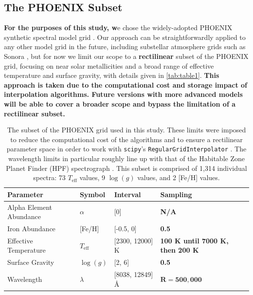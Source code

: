 \documentclass[twocolumn, linenumbers]{aastex631}
\begin{document}
\subsection{The PHOENIX Subset}
\textbf{For the purposes of this study, w}e chose the widely-adopted PHOENIX synthetic spectral model grid \citep{PHOENIX}.
Our approach can be straightforwardly applied to any other model grid in the future, including substellar atmosphere grids such as Sonora \citep{bobcat, cholla, diamondback, elfowl}, but for now we limit our scope to a \textbf{rectilinear} subset of the PHOENIX grid, focusing on near solar metallicities and a broad range of effective temperature and surface gravity, with details given in \autoref{tab:table1}.
\textbf{This approach is taken due to the computational cost and storage impact of interpolation algorithms.
Future versions with more advanced models will be able to cover a broader scope and bypass the limitation of a rectilinear subset.}

\begin{table}
    \hspace*{0.6cm}\begin{tabular}{llll}
        \hline
        \bf{Parameter} & \bf{Symbol} & \bf{Interval} & \bf{Sampling}\\
        \hline
        Alpha Element Abundance & $\alpha$ & [0]& \bf{N/A}\\
        Iron Abundance & [Fe/H] & [-0.5, 0] & \bf{0.5}\\
        Effective Temperature & $T_{\mathrm{eff}}$ & [2300, 12000] K & \bf{100 K until 7000 K, then 200 K}\\
        Surface Gravity & $\log(g)$ & [2, 6] & \bf{0.5} \\
        Wavelength & $\lambda$ & [8038, 12849] \AA & $\mathbf{R = 500,000}$\\
        \hline
    \end{tabular}
    \caption{The subset of the PHOENIX grid used in this study.
    These limits were imposed to reduce the computational cost of the algorithms and to ensure a rectilinear parameter space in order to work with \texttt{scipy}'s \texttt{RegularGridInterpolator} \citep{scipy}.
    The wavelength limits in particular roughly line up with that of the Habitable Zone Planet Finder (HPF) spectrograph \citep{HPF}.
    This subset is comprised of 1,314 individual spectra: 73 $T_{\mathrm{eff}}$ values, 9 $\log(g)$ values, and 2 [Fe/H] values.}
    \label{tab:table1}
\end{table}
\end{document}
